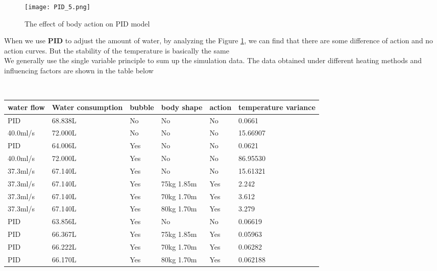 \documentclass{mcmthesis}
\begin{document}
\begin{figure}[H]
	\centerline{\texttt{[image: PID\_5.png]}}
	\caption{The effect of body action on PID model}
	\label{action_pid}	
\end{figure}
When we use \textbf{PID} to adjust the amount of water, by analyzing the Figure \ref{action_pid}, we can find that there are some difference of action and no action curves. But the stability of the temperature is basically the same\\
\indent We generally use the single variable principle to sum up the simulation data. The data obtained under different heating methods and influencing factors are shown in the table below 
\begin{table}[H]
	\setlength{\abovecaptionskip}{0pt}
	\setlength{\belowcaptionskip}{0pt}
	\\
	\begin{tabular}{p{2cm}|p{2cm}|p{1.5cm}|p{3cm}|p{1cm}|p{2cm}}
		\hline
		\rowcolor[gray]{0.9}\bf{water flow}	&\bf{Water consumption} &\bf{bubble}&\bf{body shape}&\bf{action}&\bf{temperature variance} \\
		\hline
		PID 	 & 68.838L &No  &No &No &0.0661\\
		40.0ml/s   & 72.000L &No  &No &No &15.66907\\
		\hline
		PID 	 & 64.006L &Yes &No &No &0.0621\\
		40.0ml/s   & 72.000L &Yes &No &No &86.95530\\
		\hline
		37.3ml/s & 67.140L &Yes &No &No &15.61321\\
		37.3ml/s & 67.140L &Yes &75kg 1.85m &Yes &2.242\\	
		37.3ml/s & 67.140L &Yes &70kg 1.70m &Yes &3.612\\
		37.3ml/s & 67.140L &Yes &80kg 1.70m &Yes &3.279\\
		\hline
		PID & 63.856L &Yes &No &No &0.06619\\
		PID & 66.367L &Yes &75kg 1.85m &Yes &0.05963\\	
		PID & 66.222L &Yes &70kg 1.70m &Yes &0.06282\\
		PID & 66.170L &Yes &80kg 1.70m &Yes &0.062188\\
		\hline
	\end{tabular}
\end{table}
\end{document}
